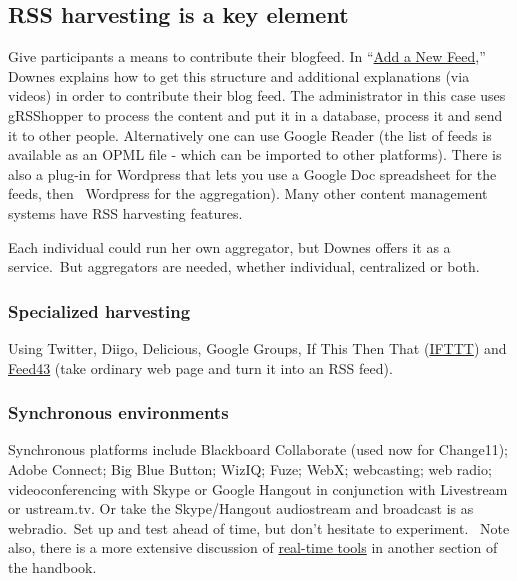 \hypertarget{rss-harvesting-is-a-key-element}{%
\subsection{RSS harvesting is a key
element}\label{rss-harvesting-is-a-key-element}}

Give participants a means to contribute their blogfeed. In
``\href{http://change.mooc.ca/new_feed.htm}{Add a New Feed},'' Downes
explains how to get this structure and additional explanations (via
videos) in order to contribute their blog feed. The administrator in
this case uses gRSShopper to process the content and put it in a
database, process it and send it to other people. Alternatively one can
use Google Reader (the list of feeds is available as an OPML file -
which can be imported to other platforms). There is also a plug-in for
Wordpress that lets you use a Google Doc spreadsheet for the feeds, then
~Wordpress for the aggregation). Many other content management systems
have RSS harvesting features.

Each individual could run her own aggregator, but Downes offers it as a
service.~But aggregators are needed, whether individual, centralized or
both.

\hypertarget{specialized-harvesting}{%
\subsubsection{Specialized harvesting}\label{specialized-harvesting}}

Using Twitter, Diigo, Delicious, Google Groups, If This Then That
(\href{http://ifttt.com}{IFTTT}) and \href{http://feed43.com}{Feed43}
(take ordinary web page and turn it into an RSS feed).

\hypertarget{synchronous-environments}{%
\subsubsection{Synchronous
environments}\label{synchronous-environments}}

Synchronous platforms include Blackboard Collaborate (used now for
Change11); Adobe Connect; Big Blue Button; WizIQ; Fuze; WebX;
webcasting; web radio; videoconferencing with Skype or Google Hangout in
conjunction with Livestream or ustream.tv. Or take the Skype/Hangout
audiostream and broadcast is as webradio.~Set up and test ahead of time,
but don't hesitate to experiment.~ Note also, there is a more extensive
discussion of \href{http://peeragogy.org/real-time-meetings/}{real-time
tools} in another section of the handbook.

